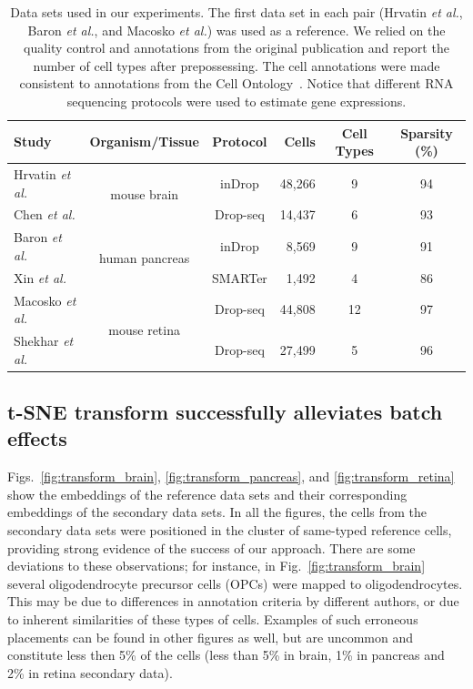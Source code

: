 \documentclass[runningheads]{llncs}
\newcommand{\etal}{\textit{et al.}}
\begin{document}
\vspace{-3mm}
\begin{table}[ht]
\begin{center}
\setlength\tabcolsep{4pt}
\begin{tabular}{l c c r c c}
\toprule
Study & Organism/Tissue & Protocol & Cells & Cell Types & Sparsity (\%) \\
\midrule
Hrvatin \etal & \multirow{2}{*}{mouse brain} & inDrop & 48,266 & 9 & 94 \\
Chen \etal & & Drop-seq & 14,437 & 6 & 93 \\[5pt]
Baron \etal & \multirow{2}{*}{human pancreas} & inDrop & 8,569 & 9 & 91 \\
Xin \etal & & SMARTer & 1,492 & 4 & 86 \\[5pt]
Macosko \etal & \multirow{2}{*}{mouse retina} & Drop-seq & 44,808 & 12 & 97 \\
Shekhar \etal & & Drop-seq & 27,499 & 5 & 96 \\
\bottomrule
\end{tabular}
\end{center}
\caption{Data sets used in our experiments. The first data set in each pair
(Hrvatin \etal, Baron \etal, and Macosko \etal) was used as a reference.  We
relied on the quality control and annotations from the original publication
and report the number of cell types after prepossessing.  The cell
annotations were made consistent to annotations from the Cell
Ontology~\cite{Bard2005}. Notice that different RNA sequencing protocols
were used to estimate gene expressions.}
\label{tab:data sets}
\end{table}

\subsection{t-SNE transform successfully alleviates batch effects}
\label{sec:results}

Figs.~\ref{fig:transform_brain}, \ref{fig:transform_pancreas}, and
\ref{fig:transform_retina} show the embeddings of the reference data sets and
their corresponding embeddings of the secondary data sets. In all the figures,
the cells from the secondary data sets were positioned in the cluster of
same-typed reference cells, providing strong evidence of the success of our approach. There are some deviations to these observations; for
instance, in Fig.~\ref{fig:transform_brain} several oligodendrocyte precursor
cells (OPCs) were mapped to oligodendrocytes. This may be due to differences in
annotation criteria by different authors, or due to inherent similarities of
these types of cells. Examples of such erroneous placements can be found in
other figures as well, but are uncommon and constitute less then 5\% of
the cells (less than 5\% in brain, 1\% in pancreas and 2\% in retina
secondary data).
\end{document}
